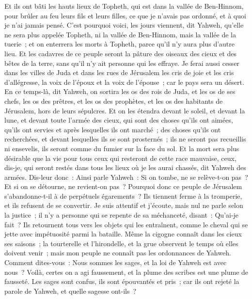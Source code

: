 \begin{multicols}{2}
Et ils ont bâti les hauts lieux de Topheth, qui est dans la vallée de Ben-Hinnom, pour brûler au feu leurs fils et leurs filles, ce que je n'avais pas ordonné, et à quoi je n'ai jamais pensé.
C'est pourquoi voici, les jours viennent, dit Yahweh, qu'elle ne sera plus appelée Topheth, ni la vallée de Ben-Hinnom, mais la vallée de la tuerie~; et on enterrera les morts à Topheth, parce qu'il n'y aura plus d'autre lieu.
Et les cadavres de ce peuple seront la pâture des oiseaux des cieux et des bêtes de la terre, sans qu'il n'y ait personne qui les effraye.
Je ferai aussi cesser dans les villes de Juda et dans les rues de Jérusalem les cris de joie et les cris d'allégresse, la voix de l'époux et la voix de l'épouse~; car le pays sera un désert.
\VerseOne{}En ce temps-là, dit Yahweh, on sortira les os des rois de Juda, et les os de ses chefs, les os des prêtres, et les os des prophètes, et les os des habitants de Jérusalem, hors de leurs sépulcres.
Et on les étendra devant le soleil, et devant la lune, et devant toute l'armée des cieux, qui sont des choses qu'ils ont aimées, qu'ils ont servies et après lesquelles ils ont marché~; des choses qu'ils ont recherchées, et devant lesquelles ils se sont prosternés~; ils ne seront pas recueillis ni ensevelis, ils seront comme du fumier sur la face du sol.
Et la mort sera plus désirable que la vie pour tous ceux qui resteront de cette race mauvaise, ceux, dis-je, qui seront restés dans tous les lieux où je les aurai chassés, dit Yahweh des armées.
Dis-leur donc~: Ainsi parle Yahweh~: Si on tombe, ne se relève-t-on pas~? Et si on se détourne, ne revient-on pas~?
Pourquoi donc ce peuple de Jérusalem s'abandonne-t-il à de perpétuels égarements~? Ils tiennent ferme à la tromperie, et ils refusent de se convertir.
Je suis attentif et j'écoute, mais nul ne parle selon la justice~; il n'y a personne qui se repente de sa méchanceté, disant~: Qu'ai-je fait~? Ils retournent tous vers les objets qui les entraînent, comme le cheval qui se jette avec impétuosité parmi la bataille.
Même la cigogne connaît dans les cieux ses saisons~; la tourterelle et l'hirondelle, et la grue observent le temps où elles doivent venir~; mais mon peuple ne connaît pas les ordonnances de Yahweh.
Comment dites-vous~: Nous sommes les sages, et la loi de Yahweh est avec nous~? Voilà, certes on a agi faussement, et la plume des scribes est une plume de fausseté.
Les sages sont confus, ils sont épouvantés et pris~; car ils ont rejeté la parole de Yahweh, et quelle sagesse ont-ils~?

\end{multicols}
